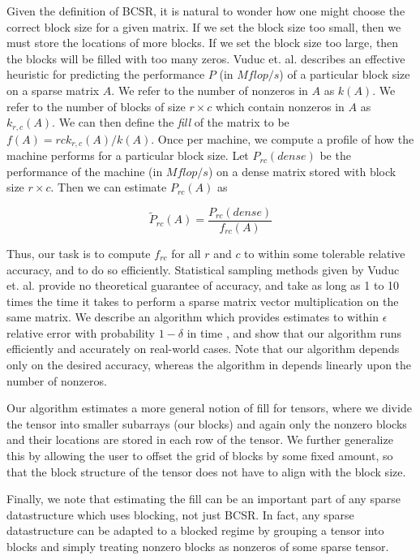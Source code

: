   Given the definition of BCSR, it is natural to wonder how one might choose the correct block size for a given matrix. If we set the block size too small, then we must store the locations of more blocks. If we set the block size too large, then the blocks will be filled with too many zeros.
  Vuduc et. al. describes an effective heuristic for predicting the performance $P$ (in $Mflop/s$) of a particular block size on a sparse matrix $A$.
  We refer to the number of nonzeros in $A$ as $k(A)$. We refer to the number of blocks of size $r \times c$ which contain nonzeros in $A$ as $k_{r, c}(A)$.
  We can then define the \textit{fill} of the matrix to be $f(A) = rck_{r, c}(A)/k(A)$.
  Once per machine, we compute a profile of how the machine performs for a particular block size.
  Let $P_{rc}(dense)$ be the performance of the machine (in $Mflop/s$) on a dense matrix stored with block size $r \times c$.
  Then we can estimate $P_{rc}(A)$ as

  \[
    \tilde{P}_{rc}(A) = \frac{P_{rc}(dense)}{f_{rc}(A)}
  \]

  Thus, our task is to compute $f_{rc}$ for all $r$ and $c$ to within some tolerable relative accuracy, and to do so efficiently. Statistical sampling methods given by Vuduc et. al. provide no theoretical guarantee of accuracy, and take as long as 1 to 10 times the time it takes to perform a sparse matrix vector multiplication on the same matrix. We describe an algorithm which provides estimates to within $\epsilon$ relative error with probability $1 - \delta$ in time , and show that our algorithm runs efficiently and accurately on real-world cases. Note that our algorithm depends only on the desired accuracy, whereas the algorithm in \cite{vuduc2003} depends linearly upon the number of nonzeros.

  Our algorithm estimates a more general notion of fill for tensors, where we divide the tensor into smaller subarrays (our blocks) and again only the nonzero blocks and their locations are stored in each row of the tensor. We further generalize this by allowing the user to offset the grid of blocks by some fixed amount, so that the block structure of the tensor does not have to align with the block size.

  Finally, we note that estimating the fill can be an important part of any sparse datastructure which uses blocking, not just BCSR. In fact, any sparse datastructure can be adapted to a blocked regime by grouping a tensor into blocks and simply treating nonzero blocks as nonzeros of some sparse tensor.
